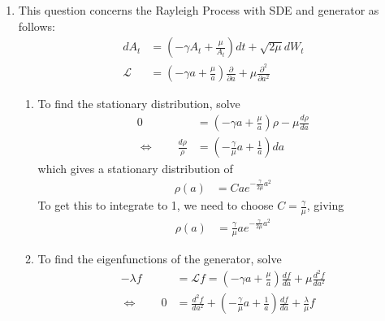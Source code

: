 \documentclass[12pt]{article}
\theoremstyle{plain}
\theoremstyle{definition}
\theoremstyle{remark}
\begin{document}
\begin{enumerate}
  \item %
    This question concerns the Rayleigh Process with SDE and generator
    as follows:
    \begin{align*}
      dA_t &= \left(-\gamma A_t + \frac{\mu}{A_t}\right) dt + \sqrt{2\mu} dW_t \\
      \mathscr{L} &= \left(-\gamma a + \frac{\mu}{a}\right) \frac{\partial}{\partial a}
        + \mu \frac{\partial^2}{\partial a^2}
    \end{align*}
    \begin{enumerate}
      \item %
        To find the stationary distribution, solve
        \begin{align*}
          0 &=
          \left(-\gamma a + \frac{\mu}{a}\right)\rho
          - \mu \frac{d \rho}{d a}
          \\
          \Leftrightarrow \qquad
          \frac{d \rho}{\rho}
          &=
          \left(-\frac{\gamma}{\mu} a + \frac{1}{a}\right)da
        \end{align*}
        which gives a stationary distribution of
        \begin{align*}
          \rho(a) &= C a e^{-\frac{\gamma}{2\mu}a^2}
        \end{align*}
        To get this to integrate to 1, we need to choose $C =
        \frac{\gamma}{\mu}$, giving
        \begin{align*}
          \rho(a) &= \frac{\gamma}{\mu} a e^{-\frac{\gamma}{2\mu}a^2}
        \end{align*}

      \item %
        To find the eigenfunctions of the generator, solve
        \begin{align*}
          -\lambda f
          &= \mathscr{L}f
          =
           \left(-\gamma a + \frac{\mu}{a}\right) \frac{d f}{d a}
            + \mu \frac{d^2 f}{d a^2} \\
          \Leftrightarrow \qquad
          0 &=
            \frac{d^2 f}{d a^2} +
           \left(-\frac{\gamma}{\mu} a + \frac{1}{a}\right) \frac{d f}{d a}
            + \frac{\lambda}{\mu} f\\
        \end{align*}
    \end{enumerate}

\end{enumerate}
\end{document}
